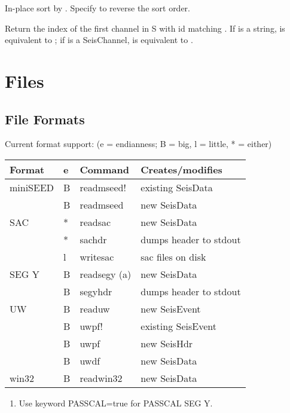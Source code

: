 \documentclass[letterpaper,11pt,english]{sphinxmanual}
\begin{document}
In-place sort by . Specify  to reverse the sort order.


\begin{fulllineitems}
\end{fulllineitems}


Return the index of the first channel in S with id matching . If  is a string,  is equivalent to ; if  is a SeisChannel,  is equivalent to .


\chapter{Files}
\label{\detokenize{index:files}}

\section{File Formats}
\label{\detokenize{src/Formats/fileformats:file-formats}}\label{\detokenize{src/Formats/fileformats::doc}}
Current format support: (e = endianness; B = big, l = little, * = either)


\begin{savenotes}\sphinxattablestart
\centering
\begin{tabulary}{\linewidth}[t]{|T|T|T|T|}
\hline
\sphinxstyletheadfamily 
Format
&\sphinxstyletheadfamily 
e
&\sphinxstyletheadfamily 
Command
&\sphinxstyletheadfamily 
Creates/modifies
\\
\hline
miniSEED
&
B
&
readmseed!
&
existing SeisData
\\
\hline&
B
&
readmseed
&
new SeisData
\\
\hline
SAC
&
*
&
readsac
&
new SeisData
\\
\hline&
*
&
sachdr
&
dumps header to stdout
\\
\hline&
l
&
writesac
&
sac files on disk
\\
\hline
SEG Y
&
B
&
readsegy (a)
&
new SeisData
\\
\hline&
B
&
segyhdr
&
dumps header to stdout
\\
\hline
UW
&
B
&
readuw
&
new SeisEvent
\\
\hline&
B
&
uwpf!
&
existing SeisEvent
\\
\hline&
B
&
uwpf
&
new SeisHdr
\\
\hline&
B
&
uwdf
&
new SeisData
\\
\hline
win32
&
B
&
readwin32
&
new SeisData
\\
\hline
\end{tabulary}
\par
\sphinxattableend\end{savenotes}
\begin{enumerate}
\def\theenumi{\alph{enumi}}
\def\labelenumi{(\theenumi )}
\makeatletter\def\p@enumii{\p@enumi (\theenumi )}\makeatother
\item {} 
Use keyword PASSCAL=true for PASSCAL SEG Y.

\end{enumerate}
\end{document}
